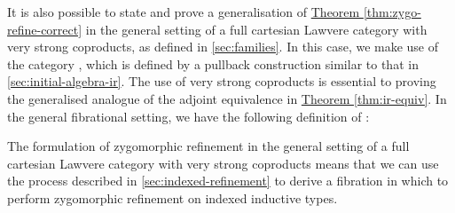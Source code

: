 \documentclass{LMCS}
\newcommand{\thmref}[1]{\hyperref[#1]{Theorem \ref*{#1}}}
\begin{document}
It is also possible to state and prove a generalisation of
\thmref{thm:zygo-refine-correct} in the general setting of a full
cartesian Lawvere category with very strong coproducts, as defined in
\autoref{sec:families}. In this case, we make use of the category
, which is defined
by a pullback construction similar to that in
\autoref{sec:initial-algebra-ir}. The use of very strong coproducts is
essential to proving the generalised analogue of the adjoint
equivalence in \thmref{thm:ir-equiv}. In the general fibrational
setting, we have the following definition of :


The formulation of zygomorphic refinement in the general setting of a
full cartesian Lawvere category with very strong coproducts means that
we can use the process described in \autoref{sec:indexed-refinement}
to derive a fibration in which to perform zygomorphic refinement on
indexed inductive types.
\end{document}
